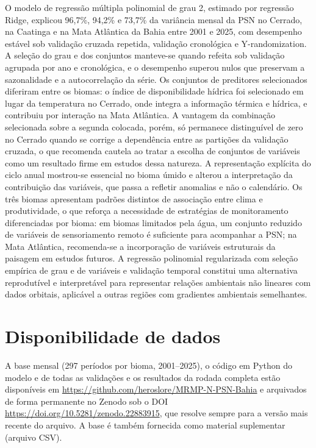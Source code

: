 \documentclass[a4paper,fleqn]{cas-dc}
\begin{document}
O modelo de regressão múltipla polinomial de grau 2, estimado por regressão Ridge, explicou 96,7\%, 94,2\% e 73,7\% da variância mensal da PSN no Cerrado, na Caatinga e na Mata Atlântica da Bahia entre 2001 e 2025, com desempenho estável sob validação cruzada repetida, validação cronológica e Y-randomization. A seleção do grau e dos conjuntos manteve-se quando refeita sob validação agrupada por ano e cronológica, e o desempenho superou nulos que preservam a sazonalidade e a autocorrelação da série. Os conjuntos de preditores selecionados diferiram entre os biomas: o índice de disponibilidade hídrica foi selecionado em lugar da temperatura no Cerrado, onde integra a informação térmica e hídrica, e contribuiu por interação na Mata Atlântica. A vantagem da combinação selecionada sobre a segunda colocada, porém, só permanece distinguível de zero no Cerrado quando se corrige a dependência entre as partições da validação cruzada, o que recomenda cautela ao tratar a escolha de conjuntos de variáveis como um resultado firme em estudos dessa natureza. A representação explícita do ciclo anual mostrou-se essencial no bioma úmido e alterou a interpretação da contribuição das variáveis, que passa a refletir anomalias e não o calendário. Os três biomas apresentam padrões distintos de associação entre clima e produtividade, o que reforça a necessidade de estratégias de monitoramento diferenciadas por bioma: em biomas limitados pela água, um conjunto reduzido de variáveis de sensoriamento remoto é suficiente para acompanhar a PSN; na Mata Atlântica, recomenda-se a incorporação de variáveis estruturais da paisagem em estudos futuros. A regressão polinomial regularizada com seleção empírica de grau e de variáveis e validação temporal constitui uma alternativa reprodutível e interpretável para representar relações ambientais não lineares com dados orbitais, aplicável a outras regiões com gradientes ambientais semelhantes.

\section*{Disponibilidade de dados}
A base mensal (297 períodos por bioma, 2001--2025), o código em Python do modelo e de todas as validações e os resultados da rodada completa estão disponíveis em \url{https://github.com/heroslore/MRMP-N-PSN-Bahia} e arquivados de forma permanente no Zenodo sob o DOI \url{https://doi.org/10.5281/zenodo.22883915}, que resolve sempre para a versão mais recente do arquivo. A base é também fornecida como material suplementar (arquivo CSV).
\end{document}
